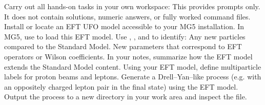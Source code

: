 \markdownRendererInterblockSeparator
{}Carry out all hands-on tasks in your own workspace:\markdownRendererInterblockSeparator
{}\markdownRendererUlBeginTight
\markdownRendererUlItem {}\markdownRendererUlItemEnd 
\markdownRendererUlEndTight \markdownRendererInterblockSeparator
{}This  provides prompts only. It does not contain solutions, numeric answers, or fully worked command files.\markdownRendererInterblockSeparator
{}\markdownRendererSectionBegin
{}\markdownRendererInterblockSeparator
{}\markdownRendererOlBeginTight
{}Install or locate an EFT UFO model accessible to your MG5 installation.\markdownRendererOlItemEnd 
{}In MG5, use  to load this EFT model.\markdownRendererOlItemEnd 
{}Use , , and  to identify:\markdownRendererInterblockSeparator
{}\markdownRendererUlBeginTight
\markdownRendererUlItem Any new particles compared to the Standard Model.\markdownRendererUlItemEnd 
\markdownRendererUlItem New parameters that correspond to EFT operators or Wilson coefficients.\markdownRendererUlItemEnd 
\markdownRendererUlEndTight \markdownRendererOlItemEnd 
{}In your notes, summarize how the EFT model extends the Standard Model content.\markdownRendererOlItemEnd 
\markdownRendererOlEndTight \markdownRendererInterblockSeparator
{}
\markdownRendererSectionEnd \markdownRendererSectionBegin
{}\markdownRendererInterblockSeparator
{}\markdownRendererOlBeginTight
{}Using your EFT model, define multiparticle labels for proton beams and leptons.\markdownRendererOlItemEnd 
{}Generate a Drell–Yan–like process (e.g. with an oppositely charged lepton pair in the final state) using the EFT model.\markdownRendererOlItemEnd 
{}Output the process to a new directory in your work area and inspect the  file.\markdownRendererOlItemEnd 
